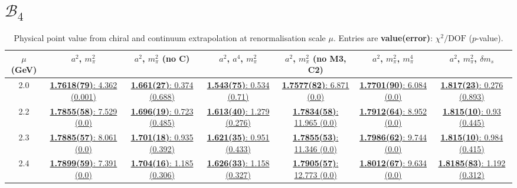 \documentclass[12pt]{extarticle}
\begin{document}
\section{$\mathcal{B}_4$}
\begin{table}[h!]
\begin{center}
\begin{tabular}{|c|c|c|c|c|c|c|}
\hline
$\mu$ (GeV) & $a^2$, $m_\pi^2$& $a^2$, $m_\pi^2$ (no C)& $a^2$, $a^4$, $m_\pi^2$& $a^2$, $m_\pi^2$ (no M3, C2)& $a^2$, $m_\pi^2$, $m_\pi^4$& $a^2$, $m_\pi^2$, $\delta m_s$\\
\hline
2.0& \hyperlink{SSpPP/SUSY/a2m2_20.pdf.1}{\textbf{1.7618(79)}: 4.362 (0.001)} & \hyperlink{SSpPP/SUSY/a2m2noC_20.pdf.1}{\textbf{1.661(27)}: 0.374 (0.688)} & \hyperlink{SSpPP/SUSY/a2a4m2_20.pdf.1}{\textbf{1.543(75)}: 0.534 (0.71)} & \hyperlink{SSpPP/SUSY/a2m2mcut_20.pdf.1}{\textbf{1.7577(82)}: 6.871 (0.0)} & \hyperlink{SSpPP/SUSY/a2m2m4_20.pdf.1}{\textbf{1.7701(90)}: 6.084 (0.0)} & \hyperlink{SSpPP/SUSY/a2m2delm_20.pdf.1}{\textbf{1.817(23)}: 0.276 (0.893)}\\
2.2& \hyperlink{SSpPP/SUSY/a2m2_22.pdf.1}{\textbf{1.7855(58)}: 7.529 (0.0)} & \hyperlink{SSpPP/SUSY/a2m2noC_22.pdf.1}{\textbf{1.696(19)}: 0.723 (0.485)} & \hyperlink{SSpPP/SUSY/a2a4m2_22.pdf.1}{\textbf{1.613(40)}: 1.279 (0.276)} & \hyperlink{SSpPP/SUSY/a2m2mcut_22.pdf.1}{\textbf{1.7834(58)}: 11.965 (0.0)} & \hyperlink{SSpPP/SUSY/a2m2m4_22.pdf.1}{\textbf{1.7912(64)}: 8.952 (0.0)} & \hyperlink{SSpPP/SUSY/a2m2delm_22.pdf.1}{\textbf{1.815(10)}: 0.93 (0.445)}\\
2.3& \hyperlink{SSpPP/SUSY/a2m2_23.pdf.1}{\textbf{1.7885(57)}: 8.061 (0.0)} & \hyperlink{SSpPP/SUSY/a2m2noC_23.pdf.1}{\textbf{1.701(18)}: 0.935 (0.392)} & \hyperlink{SSpPP/SUSY/a2a4m2_23.pdf.1}{\textbf{1.621(35)}: 0.951 (0.433)} & \hyperlink{SSpPP/SUSY/a2m2mcut_23.pdf.1}{\textbf{1.7855(53)}: 11.346 (0.0)} & \hyperlink{SSpPP/SUSY/a2m2m4_23.pdf.1}{\textbf{1.7986(62)}: 9.744 (0.0)} & \hyperlink{SSpPP/SUSY/a2m2delm_23.pdf.1}{\textbf{1.815(10)}: 0.984 (0.415)}\\
2.4& \hyperlink{SSpPP/SUSY/a2m2_24.pdf.1}{\textbf{1.7899(59)}: 7.391 (0.0)} & \hyperlink{SSpPP/SUSY/a2m2noC_24.pdf.1}{\textbf{1.704(16)}: 1.185 (0.306)} & \hyperlink{SSpPP/SUSY/a2a4m2_24.pdf.1}{\textbf{1.626(33)}: 1.158 (0.327)} & \hyperlink{SSpPP/SUSY/a2m2mcut_24.pdf.1}{\textbf{1.7905(57)}: 12.773 (0.0)} & \hyperlink{SSpPP/SUSY/a2m2m4_24.pdf.1}{\textbf{1.8012(67)}: 9.634 (0.0)} & \hyperlink{SSpPP/SUSY/a2m2delm_24.pdf.1}{\textbf{1.8185(83)}: 1.192 (0.312)}\\
\hline
\end{tabular}
\caption{Physical point value from chiral and continuum extrapolation at renormalisation scale $\mu$. Entries are \textbf{value(error)}: $\chi^2/\text{DOF}$ ($p$-value).}
\end{center}
\end{table}
\end{document}
